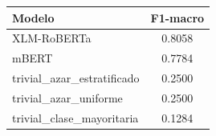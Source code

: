 \begin{tabular}{lc}
\toprule
Modelo & F1-macro \\
\midrule
XLM-RoBERTa & 0.8058 \\
mBERT & 0.7784 \\
trivial\_azar\_estratificado & 0.2500 \\
trivial\_azar\_uniforme & 0.2500 \\
trivial\_clase\_mayoritaria & 0.1284 \\
\bottomrule
\end{tabular}
